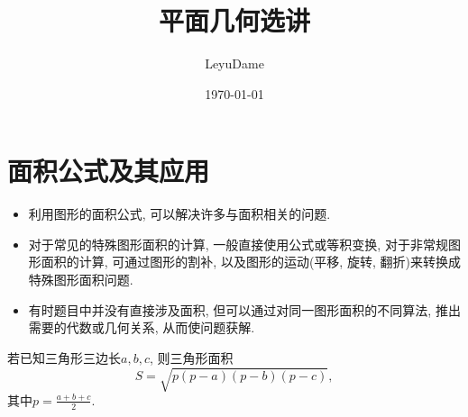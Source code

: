 \documentclass{March}
\title{平面几何选讲}
\author{LeyuDame}
\date{\today}
\begin{document}
\maketitle
\tableofcontents
\newpage
\section{面积公式及其应用}
\begin{itemize}
	\item 利用图形的面积公式, 可以解决许多与面积相关的问题.
	\item 对于常见的特殊图形面积的计算, 一般直接使用公式或等积变换, 对于非常规图形面积的计算, 可通过图形的割补, 以及图形的运动(平移, 旋转, 翻折)来转换成特殊图形面积问题.
	\item 有时题目中并没有直接涉及面积, 但可以通过对同一图形面积的不同算法, 推出需要的代数或几何关系, 从而使问题获解.
\end{itemize}
\begin{formula}[海伦公式]
	若已知三角形三边长$a, b, c$, 则三角形面积
	$$
		S=\sqrt{p(p-a)(p-b)(p-c)},
	$$其中$p=\frac{a+b+c}{2}$.
\end{formula}
\end{document}
